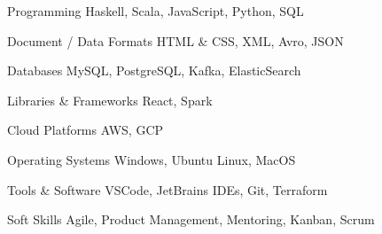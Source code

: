 


\begin{cvskills}


\cvskill
{Programming} %
{Haskell, Scala, JavaScript, Python, SQL} %


\cvskill
{Document / Data Formats} %
{HTML \& CSS, XML, Avro, JSON} %


\cvskill
{Databases} %
{MySQL, PostgreSQL, Kafka, ElasticSearch} %



\cvskill
{Libraries \& Frameworks} %
{React, Spark} %


\cvskill
{Cloud Platforms} %
{AWS, GCP} %


\cvskill
{Operating Systems} %
{Windows, Ubuntu Linux, MacOS} %


\cvskill
{Tools \& Software} %
{VSCode, JetBrains IDEs, Git, Terraform} %


\cvskill
{Soft Skills} %
{Agile, Product Management, Mentoring, Kanban, Scrum} %


\end{cvskills}